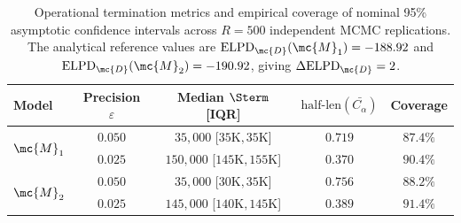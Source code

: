 \begin{table}[H]
\centering
\caption{Operational termination metrics and empirical coverage of nominal 95\% asymptotic confidence intervals across $R = 500$ independent MCMC replications. The analytical reference values are $\mathrm{ELPD}_{\mc{D}}(\mc{M}_1) = -188.92$ and $\mathrm{ELPD}_{\mc{D}}(\mc{M}_2) = -190.92$, giving $\Delta\mathrm{ELPD}_{\mc{D}} = 2$.} 
\label{tab:reps_summary}
\begingroup\small\setlength{\tabcolsep}{5.5pt}
\begin{tabular}{lcccc}
  \toprule
Model & Precision $\varepsilon$ & Median $\Sterm$ [IQR] & $\text{half-len}(\bar{C_\alpha})$ & Coverage \\ 
  \midrule
\multirow{2}{*}{$\mc{M}_1$} & $0.050$ & $35{,}000$ [$35\text{K}, 35\text{K}$] & $0.719$ & $87.4\%$ \\ 
   & $0.025$ & $150{,}000$ [$145\text{K}, 155\text{K}$] & $0.370$ & $90.4\%$ \\ 
   \midrule
\multirow{2}{*}{$\mc{M}_2$} & $0.050$ & $35{,}000$ [$30\text{K}, 35\text{K}$] & $0.756$ & $88.2\%$ \\ 
   & $0.025$ & $145{,}000$ [$140\text{K}, 145\text{K}$] & $0.389$ & $91.4\%$ \\ 
   \bottomrule
\end{tabular}
\endgroup
\end{table}
